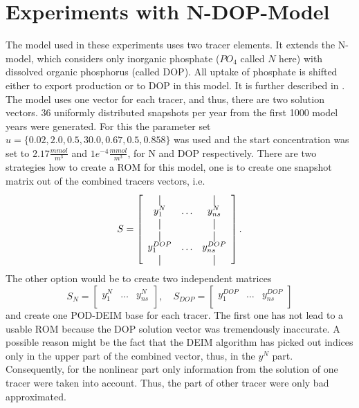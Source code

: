 \section{Experiments with N-DOP-Model}\label{numerical_n-dop}
The model used in these experiments uses two tracer elements. It extends the N-model, which considers only inorganic phosphate ($PO_4$ called $N$ here) with dissolved
organic phosphorus (called DOP). All uptake of phosphate is shifted either to export production or to DOP in this model. It is further described in
\cite{biomodels}. The model uses one vector for each tracer, and thus, there are two solution vectors.
36 uniformly distributed snapshots per year from the first 1000 model years were generated. For this the parameter set $u= \{0.02,2.0,0.5,30.0,0.67,0.5,0.858\}$  was used and the start concentration was set to $2.17\frac{mmol}{m^3}$ and $1e^{-4} \frac{mmol}{m^3}$, for N and DOP respectively.
There are two strategies how to create a ROM for this model, one is to create one snapshot matrix out of the combined tracers vectors, i.e. 
\begin{equation*}
S = \left [
\begin{array}{ccc}
\vertbar &        & \vertbar \\
 y^N_1 &  \ldots & y^N_{ns}\\
 \vertbar &        & \vertbar \\
  \vertbar &        & \vertbar \\
 y^{DOP}_1 & \ldots& y^{DOP}_{ns}\\
 \vertbar &         & \vertbar \\
\end{array} \right ].
\end{equation*}
The other option would be to create two independent matrices 
\begin{equation*}
S_N = \left [
\begin{array}{ccc}
 y^N_1 &  \ldots & y^N_{ns}\\
\end{array} \right ], \quad
 S_{DOP} = \left [
\begin{array}{ccc}

 y^{DOP}_1 & \ldots& y^{DOP}_{ns}\\

\end{array} \right ]
\end{equation*}
and create one POD-DEIM base for each tracer. 
The first one has not lead to a usable ROM because the DOP solution vector was tremendously inaccurate. A possible reason might be the fact that the DEIM algorithm has picked out indices only in the upper part of the combined vector, thus, in the $y^N$ part.
Consequently, for the nonlinear part only information from the solution of one tracer were taken into account. Thus, the part of other tracer were only bad approximated.

